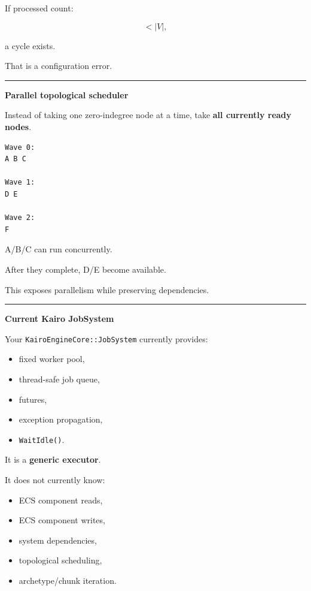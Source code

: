 If processed count:

\[
<|V|,
\]

a cycle exists.

That is a configuration error.

\begin{center}\rule{0.5\linewidth}{0.5pt}\end{center}

\textbf{Parallel topological scheduler}

Instead of taking one zero-indegree node at a time, take \textbf{all currently ready nodes}.

\begin{verbatim}
Wave 0:
A B C

Wave 1:
D E

Wave 2:
F
\end{verbatim}

A/B/C can run concurrently.

After they complete, D/E become available.

This exposes parallelism while preserving dependencies.

\begin{center}\rule{0.5\linewidth}{0.5pt}\end{center}

\textbf{Current Kairo JobSystem}

Your \texttt{KairoEngineCore::JobSystem} currently provides:

\begin{itemize}
\tightlist
\item
  fixed worker pool,
\item
  thread-safe job queue,
\item
  futures,
\item
  exception propagation,
\item
  \texttt{WaitIdle()}.
\end{itemize}

It is a \textbf{generic executor}.

It does not currently know:

\begin{itemize}
\tightlist
\item
  ECS component reads,
\item
  ECS component writes,
\item
  system dependencies,
\item
  topological scheduling,
\item
  archetype/chunk iteration.
\end{itemize}

